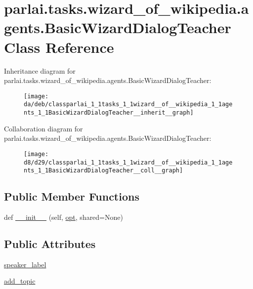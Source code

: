 \hypertarget{classparlai_1_1tasks_1_1wizard__of__wikipedia_1_1agents_1_1BasicWizardDialogTeacher}{}\section{parlai.\+tasks.\+wizard\+\_\+of\+\_\+wikipedia.\+agents.\+Basic\+Wizard\+Dialog\+Teacher Class Reference}
\label{classparlai_1_1tasks_1_1wizard__of__wikipedia_1_1agents_1_1BasicWizardDialogTeacher}


Inheritance diagram for parlai.\+tasks.\+wizard\+\_\+of\+\_\+wikipedia.\+agents.\+Basic\+Wizard\+Dialog\+Teacher\+:
\nopagebreak
\begin{figure}[H]
\begin{center}
\leavevmode
\texttt{[image: da/deb/classparlai\_1\_1tasks\_1\_1wizard\_\_of\_\_wikipedia\_1\_1agents\_1\_1BasicWizardDialogTeacher\_\_inherit\_\_graph]}
\end{center}
\end{figure}


Collaboration diagram for parlai.\+tasks.\+wizard\+\_\+of\+\_\+wikipedia.\+agents.\+Basic\+Wizard\+Dialog\+Teacher\+:
\nopagebreak
\begin{figure}[H]
\begin{center}
\leavevmode
\texttt{[image: d8/d29/classparlai\_1\_1tasks\_1\_1wizard\_\_of\_\_wikipedia\_1\_1agents\_1\_1BasicWizardDialogTeacher\_\_coll\_\_graph]}
\end{center}
\end{figure}
\subsection*{Public Member Functions}
\begin{DoxyCompactItemize}
\item 
def \hyperlink{classparlai_1_1tasks_1_1wizard__of__wikipedia_1_1agents_1_1BasicWizardDialogTeacher_acdbd15d6e87bcc9e1c0482284a8119ec}{\+\_\+\+\_\+init\+\_\+\+\_\+} (self, \hyperlink{classparlai_1_1tasks_1_1wizard__of__wikipedia_1_1agents_1_1WizardOfWikipediaTeacher_a5d97ef38a8c6e7df29724122f5b9ff72}{opt}, shared=None)
\end{DoxyCompactItemize}
\subsection*{Public Attributes}
\begin{DoxyCompactItemize}
\item 
\hyperlink{classparlai_1_1tasks_1_1wizard__of__wikipedia_1_1agents_1_1BasicWizardDialogTeacher_a7cba3c53db23ee567eeafa10b1f48840}{speaker\+\_\+label}
\item 
\hyperlink{classparlai_1_1tasks_1_1wizard__of__wikipedia_1_1agents_1_1BasicWizardDialogTeacher_a5d822b8cbc645ad8c451c6ff3fca9af3}{add\+\_\+topic}
\end{DoxyCompactItemize}

